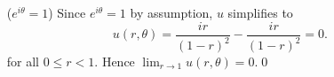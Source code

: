 \documentclass[paperoneside]{article}
\begin{document}
\begin{enumerate}[label=(\roman*)]
\begin{itemize}[leftmargin=43pt]
      \item[($e^{i\theta} = 1$)] Since $e^{i\theta} = 1$ by assumption, $u$ simplifies to \[
        u(r, \theta)
        = \frac{ir}{(1 - r)^2}
        - \frac{ir}{(1 - r)^2} = 0 \text{.}
      \] for all $0 \leq r < 1$. Hence $\lim_{r\to1} u(r, \theta) = 0$.\qed
      \end{itemize}
  \end{enumerate}
\end{document}
